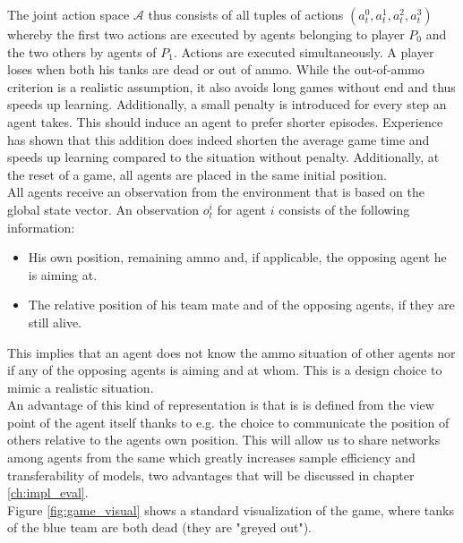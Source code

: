 The joint action space $\mathcal{A}$ thus consists of all tuples of actions $(a_t^0, a_t^1, a_t^2, a_t^3)$ whereby the first two actions are executed by agents belonging to player $P_0$ and the two others by agents of $P_1$. Actions are executed simultaneously. A player loses when both his tanks are dead or out of ammo. While the out-of-ammo criterion is a realistic assumption, it also avoids long games without end and thus speeds up learning. Additionally, a small penalty is introduced for every step an agent takes. This should induce an agent to prefer shorter episodes. Experience has shown that this addition does indeed shorten the average game time and speeds up learning compared to the situation without penalty. Additionally, at the reset of a game, all agents are placed in the same initial position.\\
All agents receive an observation from the environment that is based on the global state vector. An observation $o^i_t$ for agent $i$ consists of the following information:
\begin{itemize}
    \item His own position, remaining ammo and, if applicable, the opposing agent he is aiming at.
    \item The relative position of his team mate and of the opposing agents, if they are still alive.
\end{itemize}
This implies that an agent does not know the ammo situation of other agents nor if any of the opposing agents is aiming and at whom. This is a design choice to mimic a realistic situation.\\
An advantage of this kind of representation is that is is defined from the view point of the agent itself thanks to e.g. the choice to communicate the position of others relative to the agents own position. This will allow us to share networks among agents from the same which greatly increases sample efficiency and transferability of models, two advantages that will be discussed in chapter \ref{ch:impl_eval}.\\
Figure \ref{fig:game_visual} shows a standard visualization of the game, where tanks of the blue team are both dead (they are "greyed out").

